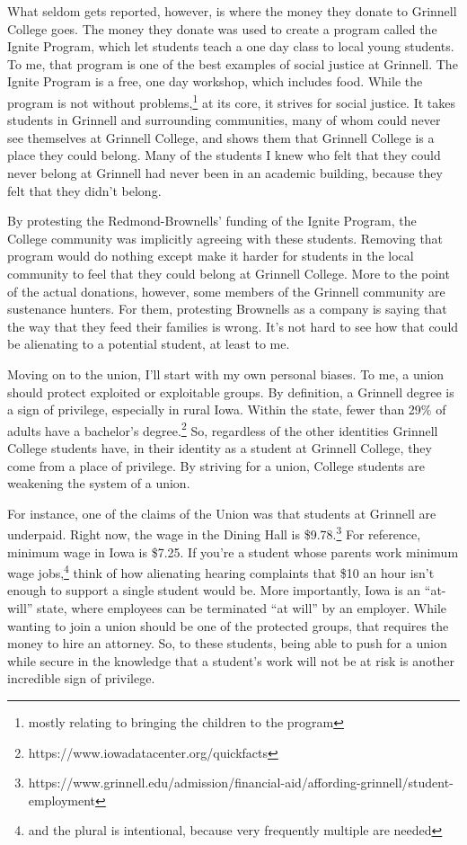 \documentclass[12pt]{article}[titlepage]
\newcommand{\say}[1]{``#1''}
\newcommand{\1}{\={a}}
\newcommand{\2}{\={e}}
\newcommand{\3}{\={\i}}
\newcommand{\4}{\=o}
\newcommand{\5}{\=u}
\newcommand{\6}{\={A}}
\renewcommand{\,}{\textsuperscript{,}}
\begin{document}
What seldom gets reported, however, is where the money they donate to Grinnell College goes.
The money they donate was used to create a program called the Ignite Program, which let students teach a one day class to local young students.
To me, that program is one of the best examples of social justice at Grinnell.
The Ignite Program is a free, one day workshop, which includes food.
While the program is not without problems,\footnote{mostly relating to bringing the children to the program} at its core, it strives for social justice.
It takes students in Grinnell and surrounding communities, many of whom could never see themselves at Grinnell College, and shows them that Grinnell College is a place they could belong.
Many of the students I knew who felt that they could never belong at Grinnell had never been in an academic building, because they felt that they didn't belong.

By protesting the Redmond-Brownells' funding of the Ignite Program, the College community was implicitly agreeing with these students.
Removing that program would do nothing except make it harder for students in the local community to feel that they could belong at Grinnell College.
More to the point of the actual donations, however, some members of the Grinnell community are sustenance hunters.
For them, protesting Brownells as a company is saying that the way that they feed their families is wrong.
It's not hard to see how that could be alienating to a potential student, at least to me.

Moving on to the union, I'll start with my own personal biases.
To me, a union should protect exploited or exploitable groups.
By definition, a Grinnell degree is a sign of privilege, especially in rural Iowa.
Within the state, fewer than 29\% of adults have a bachelor's degree.\footnote{https://www.iowadatacenter.org/quickfacts}
So, regardless of the other identities Grinnell College students have, in their identity as a student at Grinnell College, they come from a place of privilege.
By striving for a union, College students are weakening the system of a union.

For instance, one of the claims of the Union was that students at Grinnell are underpaid.
Right now, the wage in the Dining Hall is \$9.78.\footnote{https://www.grinnell.edu/admission/financial-aid/affording-grinnell/student-employment}
For reference, minimum wage in Iowa is \$7.25.
If you're a student whose parents work minimum wage jobs,\footnote{and the plural is intentional, because very frequently multiple are needed} think of how alienating hearing complaints that \$10 an hour isn't enough to support a single student would be.
More importantly, Iowa is an \say{at-will} state, where employees can be terminated \say{at will} by an employer.
While wanting to join a union should be one of the protected groups, that requires the money to hire an attorney.
So, to these students, being able to push for a union while secure in the knowledge that a student's work will not be at risk is another incredible sign of privilege.
\end{document}
